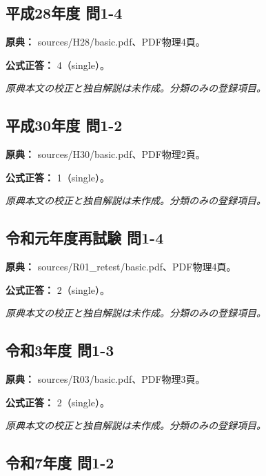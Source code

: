 \subsection{平成28年度 問1-4}
\label{q:h28-reg-basic-1-4}

\noindent\textbf{原典：} sources/H28/basic.pdf、PDF物理4頁。

\textbf{公式正答：} 4（single）。

\par\textit{原典本文の校正と独自解説は未作成。分類のみの登録項目。}

\subsection{平成30年度 問1-2}
\label{q:h30-reg-basic-1-2}

\noindent\textbf{原典：} sources/H30/basic.pdf、PDF物理2頁。

\textbf{公式正答：} 1（single）。

\par\textit{原典本文の校正と独自解説は未作成。分類のみの登録項目。}

\subsection{令和元年度再試験 問1-4}
\label{q:r01-ret-basic-1-4}

\noindent\textbf{原典：} sources/R01\_retest/basic.pdf、PDF物理4頁。

\textbf{公式正答：} 2（single）。

\par\textit{原典本文の校正と独自解説は未作成。分類のみの登録項目。}

\subsection{令和3年度 問1-3}
\label{q:r03-reg-basic-1-3}

\noindent\textbf{原典：} sources/R03/basic.pdf、PDF物理3頁。

\textbf{公式正答：} 2（single）。

\par\textit{原典本文の校正と独自解説は未作成。分類のみの登録項目。}

\subsection{令和7年度 問1-2}
\label{q:r07-reg-basic-1-2}

